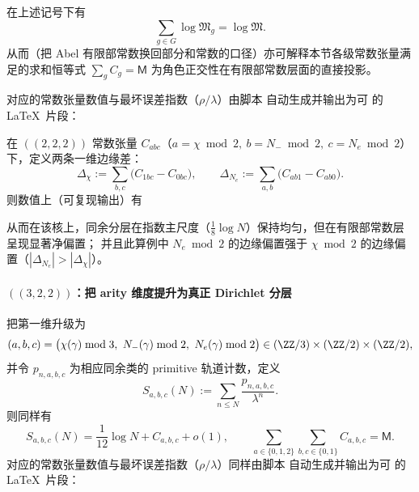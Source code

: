 \begin{remark}[常数张量的归一化一致性]\label{cor:arity-chebotarev-mertens-sum}
在上述记号下有
$$
\sum_{g\in G}\log\mathfrak{M}_g=\log\mathfrak{M}.
$$
从而（把 Abel 有限部常数换回部分和常数的口径）亦可解释本节各级常数张量满足的求和恒等式
$
\sum_g C_g=\mathsf{M}
$
为角色正交性在有限部常数层面的直接投影。
\end{remark}
对应的常数张量数值与最坏误差指数（$\rho/\lambda$）由脚本
自动生成并输出为可 \verb|| 的 \LaTeX\ 片段：


\begin{remark}\label{cor:real-input-40-mertens-222-marginal-bias}
在 \(((2,2,2))\) 常数张量 \(C_{abc}\)（\(a=\chi\bmod 2,\ b=N_-\bmod 2,\ c=N_e\bmod 2\)）下，定义两条一维边缘差：
\[
\Delta_\chi:=\sum_{b,c}\bigl(C_{1bc}-C_{0bc}\bigr),\qquad
\Delta_{N_e}:=\sum_{a,b}\bigl(C_{ab1}-C_{ab0}\bigr).
\]
则数值上（可复现输出）有

从而在该核上，同余分层在指数主尺度（\(\tfrac18\log N\)）保持均匀，但在有限部常数层呈现显著净偏置；
并且此算例中 \(N_e\bmod 2\) 的边缘偏置强于 \(\chi\bmod 2\) 的边缘偏置（\(|\Delta_{N_e}|>|\Delta_\chi|\)）。
\end{remark}

\paragraph{\texorpdfstring{$((3,2,2))$}{(3,2,2)}：把 arity 维度提升为真正 Dirichlet 分层}
把第一维升级为
$$
(a,b,c)=\bigl(\chi(\gamma)\bmod 3,\ N_-(\gamma)\bmod 2,\ N_e(\gamma)\bmod 2\bigr)\in(\ZZ/3)\times(\ZZ/2)\times(\ZZ/2),
$$
并令 $p_{n,a,b,c}$ 为相应同余类的 primitive 轨道计数，定义
$$
S_{a,b,c}(N):=\sum_{n\le N}\frac{p_{n,a,b,c}}{\lambda^n}.
$$
则同样有
$$
S_{a,b,c}(N)=\frac{1}{12}\log N + C_{a,b,c}+o(1),
\qquad
\sum_{a\in\{0,1,2\}}\sum_{b,c\in\{0,1\}}C_{a,b,c}=\mathsf{M}.
$$
对应的常数张量数值与最坏误差指数（$\rho/\lambda$）同样由脚本
自动生成并输出为可 \verb|| 的 \LaTeX\ 片段：


